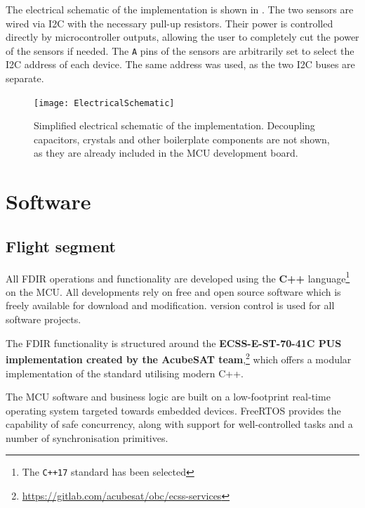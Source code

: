 \documentclass[a4paper,nobib,final]{tufte-book}
\begin{document}
The electrical schematic of the implementation is shown in .
The two sensors are wired via \ac{I2C} with the necessary pull-up resistors. Their power is controlled directly by microcontroller outputs, allowing the user to completely cut the power of the sensors if needed. The \texttt{A} pins of the sensors are arbitrarily set to select the \ac{I2C} address of each device. The same address was used, as the two \ac{I2C} buses are separate.

\begin{figure}[h]
	\texttt{[image: ElectricalSchematic]}
	\caption[Simplified electrical schematic of the implementation]{Simplified electrical schematic of the implementation. Decoupling capacitors, crystals and other boilerplate components are not shown, as they are already included in the \ac{MCU} development board.}
	\label{fig:schematic}
\end{figure}

\FloatBarrier
\section{Software}

\subsection{Flight segment}

All \ac{FDIR} operations and functionality are developed using the \textbf{C++} language\footnote{The \texttt{C++17} standard has been selected} on the \ac{MCU}. All developments rely on free and open source software which is freely available for download and modification.  version control is used for all software projects.

The \ac{FDIR} functionality is structured around the \textbf{ECSS-E-ST-70-41C \ac{PUS} implementation created by the AcubeSAT team},\footnote{\url{https://gitlab.com/acubesat/obc/ecss-services}} which offers a modular implementation of the standard utilising modern C++.

The \ac{MCU} software and business logic are built on  a low-footprint real-time operating system targeted towards embedded devices. FreeRTOS provides the capability of safe concurrency, along with support for well-controlled tasks and a number of synchronisation primitives.
\end{document}
